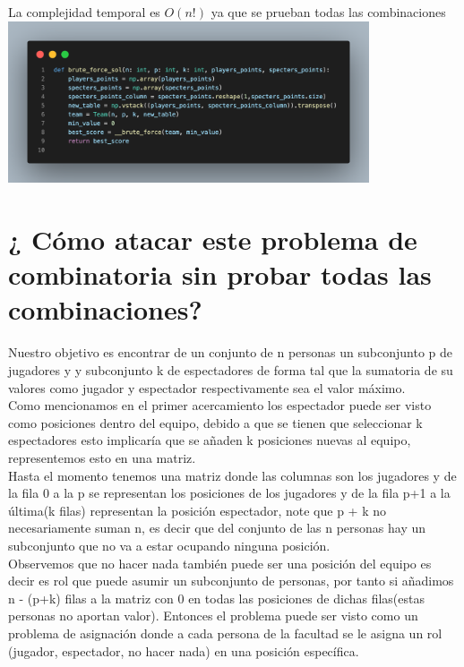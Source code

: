 \documentclass[sn-mathphys,Numbered]{sn-jnl}%
\theoremstyle{thmstyleone}%
\theoremstyle{thmstyletwo}%
\theoremstyle{thmstylethree}%
\begin{document}
La complejidad temporal es $O(n!)$ ya que se prueban todas las combinaciones\\
\includegraphics[width=0.8\textwidth]{code3.png}
\section{¿ C\'omo atacar este problema de combinatoria sin probar todas las combinaciones? }\label{sec4}
Nuestro objetivo es encontrar de un conjunto de n personas un subconjunto p de jugadores y y subconjunto k de espectadores de forma tal que la sumatoria de su valores como jugador y espectador respectivamente sea el valor máximo.\\ 
Como mencionamos en el primer acercamiento los espectador puede ser visto como posiciones dentro del equipo, debido a que se tienen que seleccionar k espectadores esto implicaría que se a\~naden k posiciones nuevas al equipo, representemos esto en una matriz.\\
Hasta el momento tenemos una matriz donde las columnas son los jugadores y de la fila 0 a la p se representan los posiciones de los jugadores y de la fila p+1 a la \'ultima(k filas) representan la posición espectador, note que p + k no necesariamente suman n, es decir que del conjunto de las n personas hay un subconjunto que no va a estar ocupando ninguna posición.\\
Observemos que no hacer nada también puede ser una posición del equipo es decir es rol que puede asumir un subconjunto de personas, por tanto si a\~nadimos n - (p+k) filas a la matriz con 0 en todas las posiciones de dichas filas(estas personas no aportan valor). Entonces el problema puede ser visto como un problema de asignaci\'on donde a cada persona de la facultad se le asigna un rol (jugador, espectador, no hacer nada) en una posici\'on espec\'ifica.\\
\end{document}
